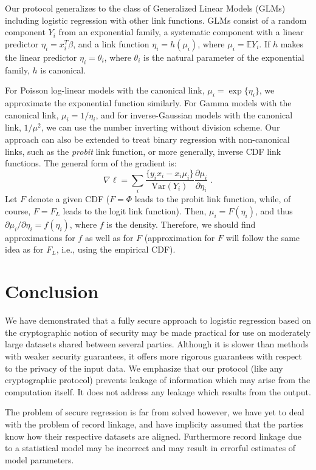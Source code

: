 \documentclass[11pt]{article}
\begin{document}
Our protocol generalizes to the class of Generalized Linear Models (GLMs) including logistic regression with other link functions.  GLMs consist of a random component $Y_i$ from an exponential family, a systematic component with a linear predictor $\eta_i = x_i^T\beta$, and a link function $\eta_i=h(\mu_i)$, where $\mu_i=\mathbb{E} Y_i$. If $h$ makes the linear predictor $\eta_i=\theta_i$, where $
\theta_i$ is the natural parameter of the exponential family,  $h$ is canonical.




For Poisson log-linear models with the canonical link, $\mu_i=\exp\{\eta_i\}$, we approximate the exponential function similarly. For Gamma models with the canonical link, $\mu_i=1/\eta_i$, and for inverse-Gaussian models with the canonical link, $1/\mu^2$,  we can use the number inverting without division scheme. Our approach can also be extended to treat binary regression with non-canonical links, such as the \emph{probit} link function, or more generally, inverse CDF link functions. The general form of the gradient is:
\begin{equation}
\nabla \ell =  \sum_i \frac{\{y_i x_i - x_i \mu_i\}}{\text{Var}(Y_i)} \frac{\partial \mu_i}{\partial \eta_i} \; .
\end{equation}
Let $F$ denote a given CDF ($F=\Phi$ leads to the probit link function, while, of course, $F=F_L$ leads to the logit link function). Then, $\mu_i = F(\eta_i)$, and thus $\partial \mu_i/\partial \eta_i = f(\eta_i)$, where $f$ is the density. Therefore, we should find approximations for $f$ as well as for $F$ (approximation for $F$ will follow the same idea as for $F_L$, i.e., using the empirical CDF).

\section{Conclusion}

We have demonstrated that a fully secure approach to logistic regression based on the cryptographic notion of security may be made practical for use on moderately large datasets shared between several parties.  Although it is slower than methods with weaker security guarantees, it offers more rigorous guarantees with respect to the privacy of the input data.  We emphasize that our protocol (like any cryptographic protocol) prevents leakage of information which may arise from the computation itself.  It does not address any leakage which results from the output.

The problem of secure regression is far from solved however, we have yet to deal with the problem of record linkage, and have implicity assumed that the parties know how their respective datasets are aligned.  Furthermore record linkage due to a statistical model may be incorrect and may result in errorful estimates of model parameters. 
\end{document}
